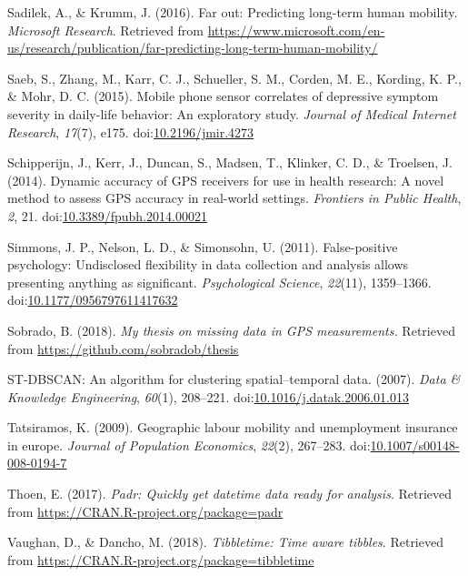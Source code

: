 \documentclass[man]{apa6}
\theoremstyle{definition}
\theoremstyle{definition}
\theoremstyle{definition}
\theoremstyle{remark}
\begin{document}
\hypertarget{ref-sadilek_far_2016}{}
Sadilek, A., \& Krumm, J. (2016). Far out: Predicting long-term human
mobility. \emph{Microsoft Research}. Retrieved from
\url{https://www.microsoft.com/en-us/research/publication/far-predicting-long-term-human-mobility/}

\hypertarget{ref-saeb_mobile_2015}{}
Saeb, S., Zhang, M., Karr, C. J., Schueller, S. M., Corden, M. E.,
Kording, K. P., \& Mohr, D. C. (2015). Mobile phone sensor correlates of
depressive symptom severity in daily-life behavior: An exploratory
study. \emph{Journal of Medical Internet Research}, \emph{17}(7), e175.
doi:\href{https://doi.org/10.2196/jmir.4273}{10.2196/jmir.4273}

\hypertarget{ref-schipperijn_dynamic_2014}{}
Schipperijn, J., Kerr, J., Duncan, S., Madsen, T., Klinker, C. D., \&
Troelsen, J. (2014). Dynamic accuracy of GPS receivers for use in health
research: A novel method to assess GPS accuracy in real-world settings.
\emph{Frontiers in Public Health}, \emph{2}, 21.
doi:\href{https://doi.org/10.3389/fpubh.2014.00021}{10.3389/fpubh.2014.00021}

\hypertarget{ref-simmons_false-positive_2011}{}
Simmons, J. P., Nelson, L. D., \& Simonsohn, U. (2011). False-positive
psychology: Undisclosed flexibility in data collection and analysis
allows presenting anything as significant. \emph{Psychological Science},
\emph{22}(11), 1359--1366.
doi:\href{https://doi.org/10.1177/0956797611417632}{10.1177/0956797611417632}

\hypertarget{ref-sobrado_my_2018}{}
Sobrado, B. (2018). \emph{My thesis on missing data in GPS
measurements.} Retrieved from \url{https://github.com/sobradob/thesis}

\hypertarget{ref-_st-dbscan:_2007}{}
ST-DBSCAN: An algorithm for clustering spatial--temporal data. (2007).
\emph{Data \& Knowledge Engineering}, \emph{60}(1), 208--221.
doi:\href{https://doi.org/10.1016/j.datak.2006.01.013}{10.1016/j.datak.2006.01.013}

\hypertarget{ref-tatsiramos_geographic_2009}{}
Tatsiramos, K. (2009). Geographic labour mobility and unemployment
insurance in europe. \emph{Journal of Population Economics},
\emph{22}(2), 267--283.
doi:\href{https://doi.org/10.1007/s00148-008-0194-7}{10.1007/s00148-008-0194-7}

\hypertarget{ref-R-padr}{}
Thoen, E. (2017). \emph{Padr: Quickly get datetime data ready for
analysis}. Retrieved from \url{https://CRAN.R-project.org/package=padr}

\hypertarget{ref-R-tibbletime}{}
Vaughan, D., \& Dancho, M. (2018). \emph{Tibbletime: Time aware
tibbles}. Retrieved from
\url{https://CRAN.R-project.org/package=tibbletime}
\end{document}
